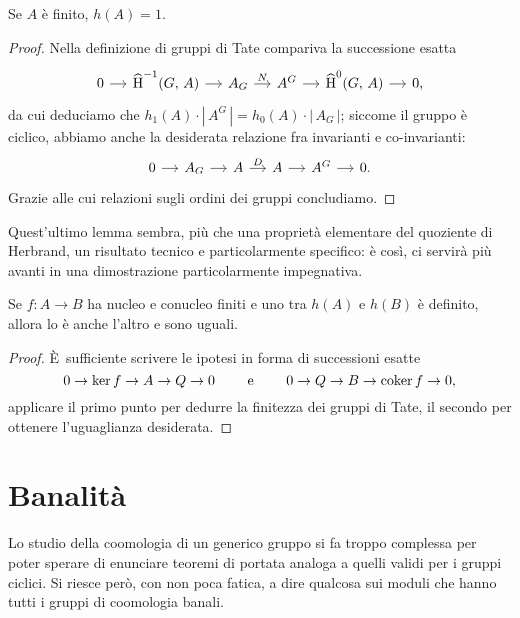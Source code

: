 \begin{lemma}\label{Herb2}
	Se $ A $ è finito, $ h(A) = 1 $.
\end{lemma}
\begin{proof}
	Nella definizione di gruppi di Tate compariva la successione esatta
	\begin{equation*}			\begin{tikzcd}[column sep = small]
	0 \rar& \Hh^{-1}(G, \, A) \rar& A_G \rar["N"]& A^G \rar&\Hh^0(G, \, A) \rar& 0,
	\end{tikzcd}
	\end{equation*}
	da cui deduciamo che $ h_1(A) \cdot |\, A^G\, | =  h_0(A) \cdot |\, A_G\, | $; siccome il gruppo è ciclico, abbiamo anche la desiderata relazione fra invarianti e co-invarianti:
	\begin{equation*}
	\begin{tikzcd}[column sep = small]
	0 \rar& A_G \rar& A \rar["D"]& A \rar& A^G \rar& 0.
	\end{tikzcd}
	\end{equation*}
	Grazie alle cui relazioni sugli ordini dei gruppi concludiamo.
\end{proof}

Quest'ultimo lemma sembra, più che una proprietà elementare del quoziente di Herbrand, un risultato tecnico e particolarmente specifico: è così, ci servirà più avanti in una dimostrazione particolarmente impegnativa.

\begin{lemma}\label{Herb3}
	Se $ f \colon A \to B $ ha nucleo e conucleo finiti e uno tra $ h(A) $ e $h(B) $ è definito, allora lo è anche l'altro e sono uguali.
\end{lemma}

\begin{proof}
	È\ sufficiente scrivere le ipotesi in forma di successioni esatte
	\[ 0 \to \ker f \to A \to Q \to 0 \qquad\text{ e } \qquad 0 \to Q \to B \to \operatorname{coker} f \to 0, \]
	applicare il primo punto per dedurre la finitezza dei gruppi di Tate, il secondo per ottenere l'uguaglianza desiderata.
\end{proof}



\section{Banalità}
Lo studio della coomologia di un generico gruppo si fa troppo complessa per poter sperare di enunciare teoremi di portata analoga a quelli validi per i gruppi ciclici. Si riesce però, con non poca fatica, a dire qualcosa sui moduli che hanno tutti i gruppi di coomologia banali.

